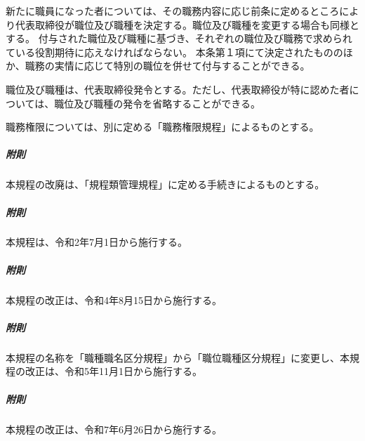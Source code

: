 \documentclass[10pt,a4paper,uplatex]{jsarticle}
\begin{document}
新たに職員になった者については、その職務内容に応じ前条に定めるところにより代表取締役が職位及び職種を決定する。職位及び職種を変更する場合も同様とする。
\term 付与された職位及び職種に基づき、それぞれの職位及び職務で求められている役割期待に応えなければならない。
\term 本条第１項にて決定されたもののほか、職務の実情に応じて特別の職位を併せて付与することができる。

職位及び職種は、代表取締役発令とする。ただし、代表取締役が特に認めた者については、職位及び職種の発令を省略することができる。

職務権限については、別に定める「職務権限規程」によるものとする。

\vspace{1cm}
\subparagraph{附則}本規程の改廃は、「規程類管理規程」に定める手続きによるものとする。
\subparagraph{附則}本規程は、令和2年7月1日から施行する。
\subparagraph{附則}本規程の改正は、令和4年8月15日から施行する。
\subparagraph{附則}本規程の名称を「職種職名区分規程」から「職位職種区分規程」に変更し、本規程の改正は、令和5年11月1日から施行する。
\subparagraph{附則}本規程の改正は、令和7年6月26日から施行する。

\end{document}
